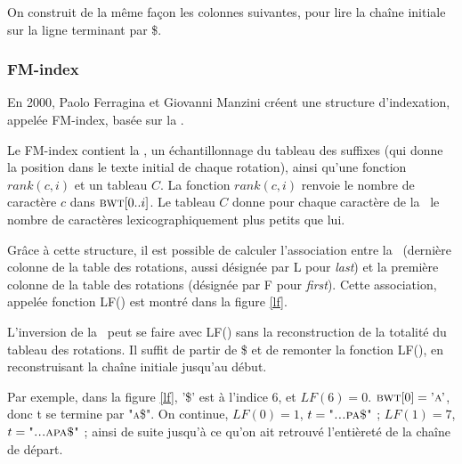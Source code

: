 On construit de la même façon les colonnes suivantes, pour lire la chaîne initiale sur la ligne terminant par \$.

\subsubsection{FM-index}

En 2000, Paolo Ferragina et Giovanni Manzini créent une structure d'indexation, appelée FM-index, basée sur la \bwt. 

Le FM-index contient la \bwt, un échantillonnage du tableau des suffixes (qui donne la position dans le texte initial de chaque rotation), ainsi qu'une fonction $rank(c, i)$  et un tableau $C$.
La fonction $rank(c, i)$ renvoie  le nombre de caractère $c$ dans $\textsc{bwt}[0..i]$. Le tableau $C$ donne pour chaque caractère de la \bwt\ le nombre de caractères lexicographiquement plus petits que lui.

Grâce à cette structure, il est possible de calculer l'association entre la \bwt\ (dernière colonne de la table des rotations, aussi désignée par L pour \textit{last}) et la première colonne de la table des rotations (désignée par F pour \textit{first}). Cette association, appelée fonction LF() est montré dans la figure \ref{lf}.

L'inversion de la \bwt\ peut se faire avec LF() sans la reconstruction de la totalité du tableau des rotations. 
Il suffit de partir de \$ et de remonter la fonction LF(), en reconstruisant la chaîne initiale jusqu'au début.

Par exemple, dans la figure \ref{lf}, '\$' est à l'indice 6, et $LF(6) = 0$. $\textsc{bwt}[0] = \textsc{'a'}$, donc t se termine par \textsc{"a\$"}. On continue, $LF(0) = 1$, $t = \textsc{"...pa\$"}$ ; $LF(1) = 7$, $t = \textsc{"...apa\$"}$ ; ainsi de suite jusqu'à ce qu'on ait retrouvé l'entièreté de la chaîne de départ.

